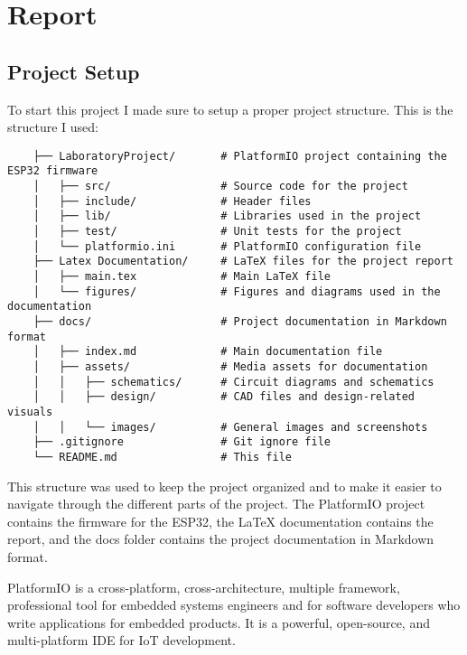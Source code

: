 \section{Report}
\label{sec:report}

\subsection{Project Setup}
To start this project I made sure to setup a proper project structure. This is the structure I used:
\begin{verbatim}
    ├── LaboratoryProject/       # PlatformIO project containing the ESP32 firmware
    │   ├── src/                 # Source code for the project
    │   ├── include/             # Header files
    │   ├── lib/                 # Libraries used in the project
    │   ├── test/                # Unit tests for the project
    │   └── platformio.ini       # PlatformIO configuration file
    ├── Latex Documentation/     # LaTeX files for the project report
    │   ├── main.tex             # Main LaTeX file
    │   └── figures/             # Figures and diagrams used in the documentation
    ├── docs/                    # Project documentation in Markdown format
    │   ├── index.md             # Main documentation file
    │   ├── assets/              # Media assets for documentation
    │   │   ├── schematics/      # Circuit diagrams and schematics
    │   │   ├── design/          # CAD files and design-related visuals
    │   │   └── images/          # General images and screenshots
    ├── .gitignore               # Git ignore file
    └── README.md                # This file
\end{verbatim}
This structure was used to keep the project organized and to make it easier to navigate through the different parts of the project. 
The PlatformIO project contains the firmware for the ESP32, the LaTeX documentation contains the report, and the docs folder contains the project documentation in Markdown format.

PlatformIO is a cross-platform, cross-architecture, multiple framework, professional tool for embedded systems engineers and for software developers who write applications for embedded products. 
It is a powerful, open-source, and multi-platform IDE for IoT development. 

\newpage

